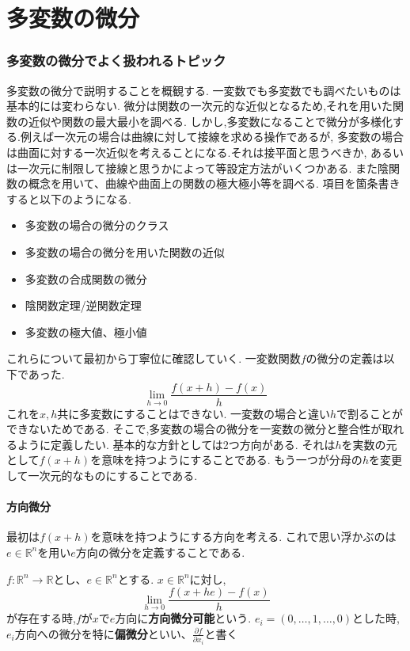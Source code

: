 \part{多変数の微分}
\section{多変数の微分でよく扱われるトピック}
多変数の微分で説明することを概観する.
一変数でも多変数でも調べたいものは基本的には変わらない.
微分は関数の一次元的な近似となるため,それを用いた関数の近似や関数の最大最小を調べる.
しかし,多変数になることで微分が多様化する.例えば一次元の場合は曲線に対して接線を求める操作であるが,
多変数の場合は曲面に対する一次近似を考えることになる.それは接平面と思うべきか,
あるいは一次元に制限して接線と思うかによって等設定方法がいくつかある.
また陰関数の概念を用いて、曲線や曲面上の関数の極大極小等を調べる.
項目を箇条書きすると以下のようになる.

\begin{itemize}
  \item  多変数の場合の微分のクラス
  \item  多変数の場合の微分を用いた関数の近似
  \item  多変数の合成関数の微分
  \item  陰関数定理/逆関数定理
  \item  多変数の極大値、極小値
\end{itemize}

これらについて最初から丁寧位に確認していく.
一変数関数$f$の微分の定義は以下であった.
\begin{equation*}
\lim_{h \to 0} \frac{f(x+h) - f(x)}{h}
\end{equation*}
これを$x, h$共に多変数にすることはできない.
一変数の場合と違い$h$で割ることができないためである.
そこで,多変数の場合の微分を一変数の微分と整合性が取れるように定義したい.
基本的な方針としては2つ方向がある.
それは$h$を実数の元として$f(x+h)$を意味を持つようにすることである.
もう一つが分母の$h$を変更して一次元的なものにすることである.

\subsection{方向微分}
最初は$f(x+h)$を意味を持つようにする方向を考える.
これで思い浮かぶのは$e \in \mathbb{R}^n$を用い$e$方向の微分を定義することである.
\begin{screen}
\begin{dfn}
$f:\mathbb{R}^n \to \mathbb{R}$とし、$e \in \mathbb{R}^n$とする.
$x \in \mathbb{R}^n$に対し,
\begin{equation*}
  \lim_{h\to0}\frac{f(x + he) - f(x)}{h}
\end{equation*}
が存在する時,$f$が$x$で$e$方向に\textbf{方向微分可能}という.
$e_i = (0, \ldots, 1, \ldots, 0)$とした時,$e_i$方向への微分を特に\textbf{偏微分}といい、$\frac{\partial f}{\partial x_i}$と書く
\end{dfn}
\end{screen}

